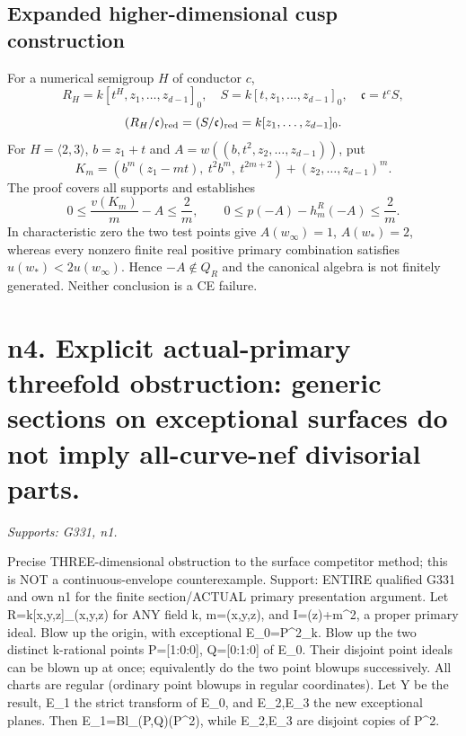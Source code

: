 \documentclass[11pt]{article}
\begin{document}
\subsection*{Expanded higher-dimensional cusp construction}
For a numerical semigroup $H$ of conductor $c$,
\[
R_H=k[t^H,z_1,\ldots,z_{d-1}]_0,\quad
S=k[t,z_1,\ldots,z_{d-1}]_0,\quad\mathfrak c=t^cS,
\]
\[
(R_H/\mathfrak c)_{\rm red}=(S/\mathfrak c)_{\rm red}=k[z_1,\ldots,z_{d-1}]_0.
\]
For $H=\langle2,3\rangle$, $b=z_1+t$ and
$A=w((b,t^2,z_2,\ldots,z_{d-1}))$, put
\[
K_m=(b^m(z_1-mt),\ t^2b^m,\ t^{2m+2})+(z_2,\ldots,z_{d-1})^m.
\]
The proof covers all supports and establishes
\[
0\leq \frac{v(K_m)}m-A\leq\frac2m,\qquad
0\leq p(-A)-h_m^R(-A)\leq\frac2m.
\]
In characteristic zero the two test points give $A(w_\infty)=1$,
$A(w_*)=2$, whereas every nonzero finite real positive primary combination
satisfies $u(w_*)<2u(w_\infty)$. Hence $-A\notin Q_R$ and the canonical
algebra is not finitely generated. Neither conclusion is a CE failure.


\section{n4. Explicit actual-primary threefold obstruction: generic sections on exceptional surfaces do not imply all-curve-nef divisorial parts.}
\textit{Supports: G331, n1.}

Precise THREE-dimensional obstruction to the surface competitor method; this is NOT a continuous-envelope counterexample. Support: ENTIRE qualified G331 and own n1 for the finite section/ACTUAL primary presentation argument. Let R=k[x,y,z]\_(x,y,z) for ANY field k, m=(x,y,z), and I=(z)+m\textasciicircum{}2, a proper primary ideal. Blow up the origin, with exceptional E\_0=P\textasciicircum{}2\_k. Blow up the two distinct k-rational points P=[1:0:0], Q=[0:1:0] of E\_0. Their disjoint point ideals can be blown up at once; equivalently do the two point blowups successively. All charts are regular (ordinary point blowups in regular coordinates). Let Y be the result, E\_1 the strict transform of E\_0, and E\_2,E\_3 the new exceptional planes. Then E\_1=Bl\_(P,Q)(P\textasciicircum{}2), while E\_2,E\_3 are disjoint copies of P\textasciicircum{}2.
\end{document}
